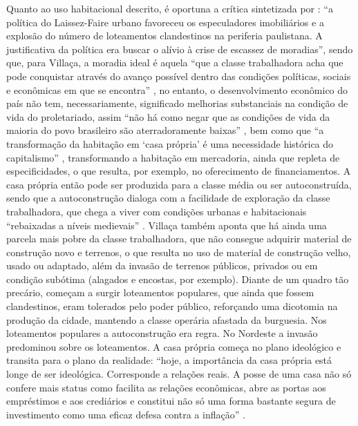 	Quanto ao uso habitacional descrito, é oportuna a crítica sintetizada por : ``a política do Laissez-Faire urbano favoreceu os especuladores imobiliários e a explosão do número de loteamentos clandestinos na periferia paulistana. A justificativa da política era buscar o alívio à crise de escassez de moradias'', sendo que, para Villaça, a moradia ideal é aquela ``que a classe trabalhadora acha que pode conquistar através do avanço possível dentro das condições políticas, sociais e econômicas em que se encontra'' \cite[p.13]{villaca1986a}, no entanto, o desenvolvimento econômico do país não tem, necessariamente, significado melhorias substanciais na condição de vida do proletariado, assim ``não há como negar que as condições de vida da maioria do povo brasileiro são aterradoramente baixas'' \cite[p.14]{villaca1986a}, bem como que ``a transformação da habitação em `casa própria' é uma necessidade histórica do capitalismo'' \cite[p.19]{villaca1986a}, transformando a habitação em mercadoria, ainda que repleta de especificidades, o que resulta, por exemplo, no oferecimento de financiamentos. A casa própria então pode ser produzida para a classe média ou ser autoconstruída, sendo que a autoconstrução dialoga com a facilidade de exploração da classe trabalhadora, que chega a viver com condições urbanas e habitacionais ``rebaixadas a níveis medievais'' \cite[p.21]{villaca1986a}. Villaça também aponta que há ainda uma parcela mais pobre da classe trabalhadora, que não consegue adquirir material de construção novo e terrenos, o que resulta no uso de material de construção velho, usado ou adaptado, além da invasão de terrenos públicos, privados ou em condição subótima (alagados e encostas, por exemplo). Diante de um quadro tão precário, começam a surgir loteamentos populares, que ainda que fossem clandestinos, eram tolerados pelo poder público, reforçando uma dicotomia na produção da cidade, mantendo a classe operária afastada da burguesia. Nos loteamentos populares a autoconstrução era regra. No Nordeste a invasão predominou sobre os loteamentos. A casa própria começa no plano ideológico e transita para o plano da realidade: ``hoje, a importância da casa própria está longe de ser ideológica. Corresponde a relações reais. A posse de uma casa não só confere mais status como facilita as relações econômicas, abre as portas aos empréstimos e aos crediários e constitui não só uma forma bastante segura de investimento como uma eficaz defesa contra a inflação'' \cite[p.24]{villaca1986a}.
	
